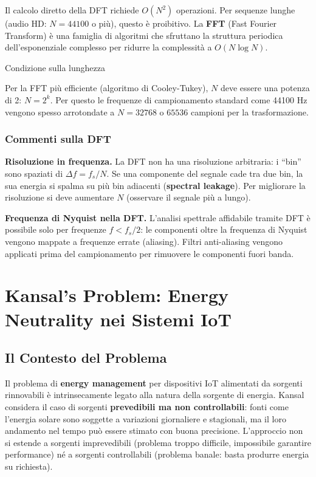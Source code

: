 \documentclass[
  italian,
  openany]{book}
\begin{document}
Il calcolo diretto della DFT richiede \(O(N^2)\) operazioni. Per
sequenze lunghe (audio HD: \(N = 44100\) o più), questo è proibitivo. La
\textbf{FFT} (Fast Fourier Transform) è una famiglia di algoritmi che
sfruttano la struttura periodica dell'esponenziale complesso per ridurre
la complessità a \(O(N \log N)\).

\begin{calloutnote}{Condizione sulla lunghezza}

Per la FFT più efficiente (algoritmo di Cooley-Tukey), \(N\) deve essere
una potenza di 2: \(N = 2^k\). Per questo le frequenze di campionamento
standard come 44100 Hz vengono spesso arrotondate a \(N = 32768\) o
\(65536\) campioni per la trasformazione.

\end{calloutnote}

\subsection{Commenti sulla DFT}\label{commenti-sulla-dft}

\textbf{Risoluzione in frequenza.} La DFT non ha una risoluzione
arbitraria: i ``bin'' sono spaziati di \(\Delta f = f_s / N\). Se una
componente del segnale cade tra due bin, la sua energia si spalma su più
bin adiacenti (\textbf{spectral leakage}). Per migliorare la risoluzione
si deve aumentare \(N\) (osservare il segnale più a lungo).

\textbf{Frequenza di Nyquist nella DFT.} L'analisi spettrale affidabile
tramite DFT è possibile solo per frequenze \(f < f_s/2\): le componenti
oltre la frequenza di Nyquist vengono mappate a frequenze errate
(aliasing). Filtri anti-aliasing vengono applicati prima del
campionamento per rimuovere le componenti fuori banda.

\newpage

\chapter{Kansal's Problem: Energy Neutrality nei Sistemi
IoT}\label{kansals-problem-energy-neutrality-nei-sistemi-iot}

\section{Il Contesto del Problema}\label{il-contesto-del-problema}

Il problema di \textbf{energy management} per dispositivi IoT alimentati
da sorgenti rinnovabili è intrinsecamente legato alla natura della
sorgente di energia. Kansal considera il caso di sorgenti
\textbf{prevedibili ma non controllabili}: fonti come l'energia solare
sono soggette a variazioni giornaliere e stagionali, ma il loro
andamento nel tempo può essere stimato con buona precisione. L'approccio
non si estende a sorgenti imprevedibili (problema troppo difficile,
impossibile garantire performance) né a sorgenti controllabili (problema
banale: basta produrre energia su richiesta).
\end{document}
